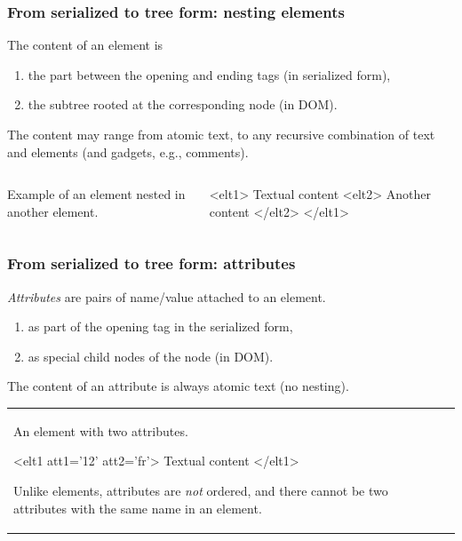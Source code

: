 \begin{frame}[fragile]
\frametitle{From serialized to tree form: nesting elements}

The content of an element is
\begin{enumerate}
  \item  the part between the opening and ending tags (in serialized form), 
  \item  the subtree rooted at the corresponding  node
     (in DOM).
\end{enumerate}

The content may range from atomic text, to any recursive
combination of text and elements (and gadgets, e.g., comments).

\begin{columns}

\column{.4\hsize}

Example of an element nested in another element.

\begin{tinyverbatim}
<elt1>
  Textual  content
  <elt2>
    Another content
  </elt2>
</elt1>
\end{tinyverbatim}

\column{.6\hsize}
   

\end{columns}
\end{frame}

\begin{frame}[fragile]
\frametitle{From serialized to tree form: attributes}

\emph{Attributes} are pairs of name/value attached to an element.
\begin{enumerate}
  \item as part of the opening tag in the serialized form, 
  \item as special child nodes of the  node
     (in DOM).
\end{enumerate}

The content of an attribute is always atomic text (no nesting).

\begin{tabular}{m{.4\hsize}m{.5\hsize}}

An element with two attributes.

\begin{tinyverbatim}
<elt1 att1='12' att2='fr'>
  Textual  content
</elt1>
\end{tinyverbatim}

  Unlike elements, attributes are \emph{not} ordered,
  and there cannot be two attributes with the same
  name in an element.

 & 
   

\end{tabular}

\end{frame}

